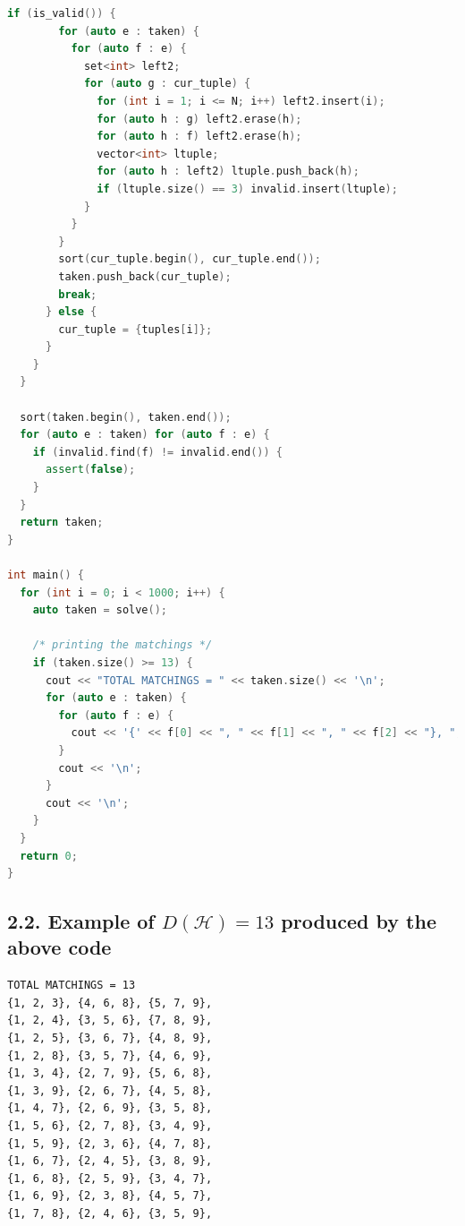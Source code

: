 \documentclass[11pt]{article}
\begin{document}
\begin{lstlisting}[language=C++]
      if (is_valid()) {
        for (auto e : taken) {
          for (auto f : e) {
            set<int> left2;
            for (auto g : cur_tuple) {
              for (int i = 1; i <= N; i++) left2.insert(i);
              for (auto h : g) left2.erase(h);
              for (auto h : f) left2.erase(h);
              vector<int> ltuple;
              for (auto h : left2) ltuple.push_back(h);
              if (ltuple.size() == 3) invalid.insert(ltuple);
            }
          }
        }
        sort(cur_tuple.begin(), cur_tuple.end());
        taken.push_back(cur_tuple);
        break;
      } else {
        cur_tuple = {tuples[i]};
      }
    }
  }

  sort(taken.begin(), taken.end());
  for (auto e : taken) for (auto f : e) {
    if (invalid.find(f) != invalid.end()) {
      assert(false);
    } 
  }
  return taken;
}

int main() {
  for (int i = 0; i < 1000; i++) {
    auto taken = solve();
    
    /* printing the matchings */
    if (taken.size() >= 13) {
      cout << "TOTAL MATCHINGS = " << taken.size() << '\n';
      for (auto e : taken) {
        for (auto f : e) {
          cout << '{' << f[0] << ", " << f[1] << ", " << f[2] << "}, "; 
        }
        cout << '\n';
      }
      cout << '\n';
    }
  }
  return 0;
}

\end{lstlisting}

\subsection*{2.2. Example of $D(\mathcal{H})=13$ produced by the above code}
\begin{lstlisting}
TOTAL MATCHINGS = 13
{1, 2, 3}, {4, 6, 8}, {5, 7, 9},
{1, 2, 4}, {3, 5, 6}, {7, 8, 9},
{1, 2, 5}, {3, 6, 7}, {4, 8, 9},
{1, 2, 8}, {3, 5, 7}, {4, 6, 9},
{1, 3, 4}, {2, 7, 9}, {5, 6, 8},
{1, 3, 9}, {2, 6, 7}, {4, 5, 8},
{1, 4, 7}, {2, 6, 9}, {3, 5, 8}, 
{1, 5, 6}, {2, 7, 8}, {3, 4, 9},
{1, 5, 9}, {2, 3, 6}, {4, 7, 8},
{1, 6, 7}, {2, 4, 5}, {3, 8, 9},
{1, 6, 8}, {2, 5, 9}, {3, 4, 7},
{1, 6, 9}, {2, 3, 8}, {4, 5, 7},
{1, 7, 8}, {2, 4, 6}, {3, 5, 9},
\end{lstlisting}
\end{document}
